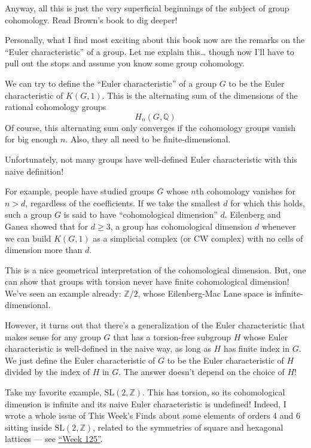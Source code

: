 \documentclass{article}
\begin{document}
Anyway, all this is just the very superficial beginnings of the subject
of group cohomology. Read Brown's book to dig deeper!

Personally, what I find most exciting about this book now are the
remarks on the ``Euler characteristic'' of a group. Let me explain
this\ldots{} though now I'll have to pull out the stops and assume you
know some group cohomology.

We can try to define the ``Euler characteristic'' of a group \(G\) to be
the Euler characteristic of \(K(G,1)\). This is the alternating sum of
the dimensions of the rational cohomology groups \[H_n(G,\mathbb{Q})\]
Of course, this alternating sum only converges if the cohomology groups
vanish for big enough \(n\). Also, they all need to be
finite-dimensional.

Unfortunately, not many groups have well-defined Euler characteristic
with this naive definition!

For example, people have studied groups \(G\) whose \(n\)th cohomology
vanishes for \(n > d\), regardless of the coefficients. If we take the
smallest \(d\) for which this holds, such a group \(G\) is said to have
``cohomological dimension'' \(d\). Eilenberg and Ganea showed that for
\(d \geqslant 3\), a group has cohomological dimension \(d\) whenever we
can build \(K(G,1)\) as a simplicial complex (or CW complex) with no
cells of dimension more than \(d\).

This is a nice geometrical interpretation of the cohomological
dimension. But, one can show that groups with torsion never have finite
cohomological dimension! We've seen an example already:
\(\mathbb{Z}/2\), whose Eilenberg-Mac Lane space is
infinite-dimensional.

However, it turns out that there's a generalization of the Euler
characteristic that makes sense for any group \(G\) that has a
torsion-free subgroup \(H\) whose Euler characteristic is well-defined
in the naive way, as long as \(H\) has finite index in \(G\). We just
define the Euler characteristic of \(G\) to be the Euler characteristic
of \(H\) divided by the index of \(H\) in \(G\). The answer doesn't
depend on the choice of \(H\)!

Take my favorite example, \(\mathrm{SL}(2,\mathbb{Z})\). This has
torsion, so its cohomological dimension is infinite and its naive Euler
characteristic is undefined! Indeed, I wrote a whole issue of This
Week's Finds about some elements of orders 4 and 6 sitting inside
\(\mathrm{SL}(2,\mathbb{Z})\), related to the symmetries of square and
hexagonal lattices --- see \protect\hyperlink{week125}{``Week 125''}.
\end{document}
